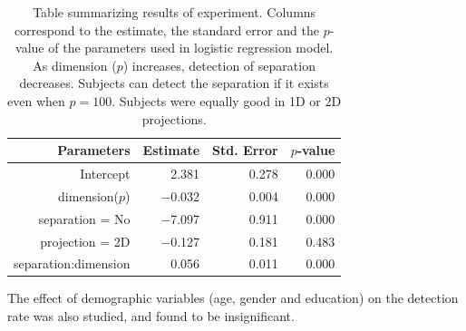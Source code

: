 \begin{table}[ht]
\begin{center}
\caption{Table summarizing results of experiment. Columns correspond to the estimate, the standard error and the $p$-value of the parameters used in logistic regression model. As dimension ($p$) increases, detection of separation decreases. Subjects can detect the separation if it exists even when $p = 100$. Subjects were equally good in 1D or 2D projections.}
\vspace{0.15cm}
\begin{tabular}{r|rrr}
\hline
  \hline
 Parameters & Estimate & Std. Error  & $p$-value \\ 
  \hline
Intercept  & 2.381 & 0.278  & 0.000 \\ 
  dimension($p$) & $-$0.032 & 0.004  & 0.000 \\ 
  separation = No & $-$7.097 & 0.911  & 0.000 \\ 
  projection = 2D & $-$0.127 & 0.181  & 0.483 \\ 
  separation:dimension & 0.056 & 0.011 & 0.000\\
   \hline
\end{tabular}
\label{params}
\end{center}
\end{table}

The effect of demographic variables (age, gender and education) on the detection rate was also studied, and found to be insignificant. 




